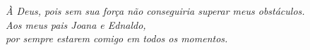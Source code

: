 \begin{dedicatoria}
   \vspace*{\fill}
   \centering
   \noindent
   \textit{ À Deus, pois sem sua força não conseguiria superar meus obstáculos. \\
   Aos meus pais Joana e Ednaldo, \\ 
   			por sempre estarem comigo em todos os 				momentos.} \vspace*{\fill}
\end{dedicatoria}
